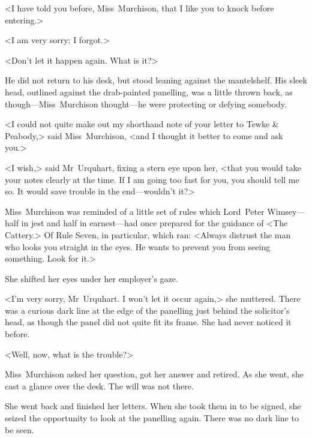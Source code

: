 <I have told you before, Miss~Murchison, that I like you to knock before entering.>

<I am very sorry; I forgot.>

<Don't let it happen again. What is it?>

He did not return to his desk, but stood leaning against the mantelshelf. His sleek head, outlined against the drab-painted panelling, was a little thrown back, as though—Miss~Murchison thought—he were protecting or defying somebody.

<I could not quite make out my shorthand note of your letter to Tewke \& Peabody,> said Miss~Murchison, <and I thought it better to come and ask you.>

<I wish,> said Mr~Urquhart, fixing a stern eye upon her, <that you would take your notes clearly at the time. If I am going too fast for you, you should tell me so. It would save trouble in the end—wouldn't it?>

Miss~Murchison was reminded of a little set of rules which Lord~Peter Wimsey—half in jest and half in earnest—had once prepared for the guidance of <The Cattery.> Of Rule Seven, in particular, which ran: <Always distrust the man who looks you straight in the eyes. He wants to prevent you from seeing something. Look for it.>

She shifted her eyes under her employer's gaze.

<I'm very sorry, Mr~Urquhart. I won't let it occur again,> she muttered. There was a curious dark line at the edge of the panelling just behind the solicitor's head, as though the panel did not quite fit its frame. She had never noticed it before.

<Well, now, what is the trouble?>

Miss~Murchison asked her question, got her answer and retired. As she went, she cast a glance over the desk. The will was not there.

She went back and finished her letters. When she took them in to be signed, she seized the opportunity to look at the panelling again. There was no dark line to be seen.

